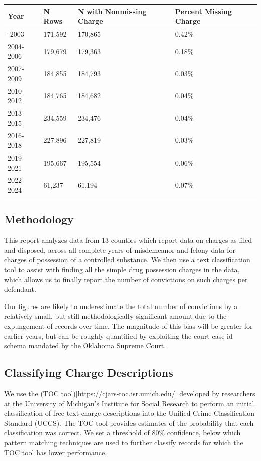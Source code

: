 \documentclass[
  letterpaper,
  DIV=11,
  numbers=noendperiod]{scrartcl}
\begin{document}
\begin{longtable}[]{@{}llll@{}}
\toprule\noalign{}
Year & N Rows & N with Nonmissing Charge & Percent Missing Charge \\
\midrule\noalign{}
\endhead
\bottomrule\noalign{}
\endlastfoot
2001-2003 & 171,592 & 170,865 & 0.42\% \\
2004-2006 & 179,679 & 179,363 & 0.18\% \\
2007-2009 & 184,855 & 184,793 & 0.03\% \\
2010-2012 & 184,765 & 184,682 & 0.04\% \\
2013-2015 & 234,559 & 234,476 & 0.04\% \\
2016-2018 & 227,896 & 227,819 & 0.03\% \\
2019-2021 & 195,667 & 195,554 & 0.06\% \\
2022-2024 & 61,237 & 61,194 & 0.07\% \\
\end{longtable}

\hypertarget{methodology}{%
\subsection{Methodology}\label{methodology}}

This report analyzes data from 13 counties which report data on charges
as filed and disposed, across all complete years of misdemeanor and
felony data for charges of possession of a controlled substance. We then
use a text classification tool to assist with finding all the simple
drug possession charges in the data, which allows us to finally report
the number of convictions on such charges per defendant.

Our figures are likely to underestimate the total number of convictions
by a relatively small, but still methodologically significant amount due
to the expungement of records over time. The magnitude of this bias will
be greater for earlier years, but can be roughly quantified by
exploiting the court case id schema mandated by the Oklahoma Supreme
Court.

\hypertarget{classifying-charge-descriptions}{%
\subsection{Classifying Charge
Descriptions}\label{classifying-charge-descriptions}}

We use the (TOC tool){[}https://cjars-toc.isr.umich.edu/{]} developed by
researchers at the University of Michigan's Institute for Social
Research to perform an initial classification of free-text charge
descriptions into the Unified Crime Classification Standard (UCCS). The
TOC tool provides estimates of the probability that each classification
was correct. We set a threshold of 80\% confidence, below which pattern
matching techniques are used to further classify records for which the
TOC tool has lower performance.
\end{document}
